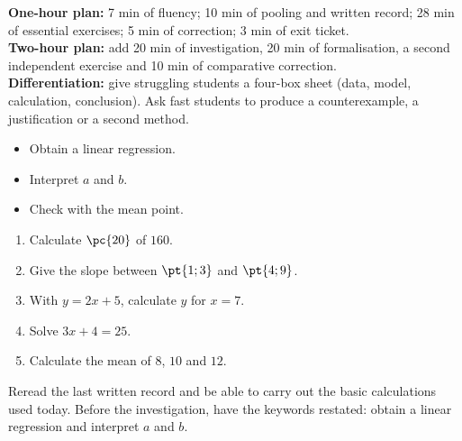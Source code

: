 \ifmxteacher
\begin{method}
\textbf{One-hour plan:} 7 min of fluency; 10 min of pooling and written record; 28 min of essential exercises; 5 min of correction; 3 min of exit ticket.\\
\textbf{Two-hour plan:} add 20 min of investigation, 20 min of formalisation, a second independent exercise and 10 min of comparative correction.\\
\textbf{Differentiation:} give struggling students a four-box sheet (data, model, calculation, conclusion). Ask fast students to produce a counterexample, a justification or a second method.
\end{method}
\fi
{}
\begin{objectives}\begin{itemize}\item Obtain a linear regression.\item Interpret $a$ and $b$.\item Check with the mean point.\end{itemize}\end{objectives}
\begin{fluency}\begin{enumerate}\item Calculate $\pc{20}$ of $160$. \item Give the slope between $\pt{1;3}$ and $\pt{4;9}$. \item With $y=2x+5$, calculate $y$ for $x=7$. \item Solve $3x+4=25$. \item Calculate the mean of $8$, $10$ and $12$. \end{enumerate}\end{fluency}
\begin{prerequisites}Reread the last written record and be able to carry out the basic calculations used today. Before the investigation, have the keywords restated: obtain a linear regression and interpret $a$ and $b$.\end{prerequisites}

